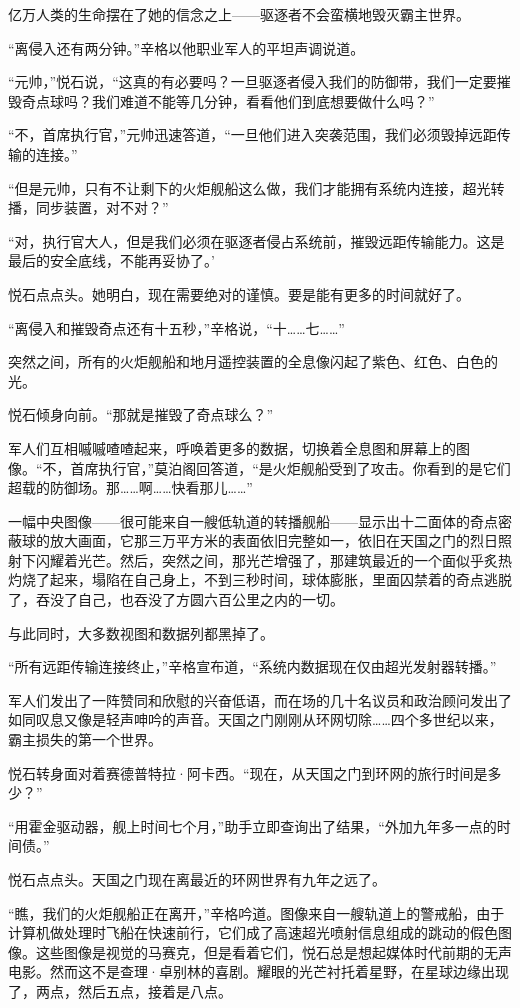 \documentclass[AutoFakeBold=true]{book}
\begin{document}
亿万人类的生命摆在了她的信念之上——驱逐者不会蛮横地毁灭霸主世界。

``离侵入还有两分钟。''辛格以他职业军人的平坦声调说道。

``元帅，''悦石说，``这真的有必要吗？一旦驱逐者侵入我们的防御带，我们一定要摧毁奇点球吗？我们难道不能等几分钟，看看他们到底想要做什么吗？''

``不，首席执行官，''元帅迅速答道，``一旦他们进入突袭范围，我们必须毁掉远距传输的连接。''

``但是元帅，只有不让剩下的火炬舰船这么做，我们才能拥有系统内连接，超光转播，同步装置，对不对？''

``对，执行官大人，但是我们必须在驱逐者侵占系统前，摧毁远距传输能力。这是最后的安全底线，不能再妥协了。'

悦石点点头。她明白，现在需要绝对的谨慎。{\kaishu 要是能有更多的时间就好了。}

``离侵入和摧毁奇点还有十五秒，''辛格说，``十……七……''

突然之间，所有的火炬舰船和地月遥控装置的全息像闪起了紫色、红色、白色的光。

悦石倾身向前。``那就是摧毁了奇点球么？''

军人们互相嘁嘁喳喳起来，呼唤着更多的数据，切换着全息图和屏幕上的图像。``不，首席执行官，''莫泊阁回答道，``是火炬舰船受到了攻击。你看到的是它们超载的防御场。那……啊……快看那儿……''

一幅中央图像——很可能来自一艘低轨道的转播舰船——显示出十二面体的奇点密蔽球的放大画面，它那三万平方米的表面依旧完整如一，依旧在天国之门的烈日照射下闪耀着光芒。然后，突然之间，那光芒增强了，那建筑最近的一个面似乎炙热灼烧了起来，塌陷在自己身上，不到三秒时间，球体膨胀，里面囚禁着的奇点逃脱了，吞没了自己，也吞没了方圆六百公里之内的一切。

与此同时，大多数视图和数据列都黑掉了。

``所有远距传输连接终止，''辛格宣布道，``系统内数据现在仅由超光发射器转播。''

军人们发出了一阵赞同和欣慰的兴奋低语，而在场的几十名议员和政治顾问发出了如同叹息又像是轻声呻吟的声音。天国之门刚刚从环网切除……四个多世纪以来，霸主损失的第一个世界。

悦石转身面对着赛德普特拉·阿卡西。``现在，从天国之门到环网的旅行时间是多少？''

``用霍金驱动器，舰上时间七个月，''助手立即查询出了结果，``外加九年多一点的时间债。''

悦石点点头。天国之门现在离最近的环网世界有九年之远了。

``瞧，我们的火炬舰船正在离开，''辛格吟道。图像来自一艘轨道上的警戒船，由于计算机做处理时飞船在快速前行，它们成了高速超光喷射信息组成的跳动的假色图像。这些图像是视觉的马赛克，但是看着它们，悦石总是想起媒体时代前期的无声电影。然而这不是查理·卓别林的喜剧。耀眼的光芒衬托着星野，在星球边缘出现了，两点，然后五点，接着是八点。
\end{document}
